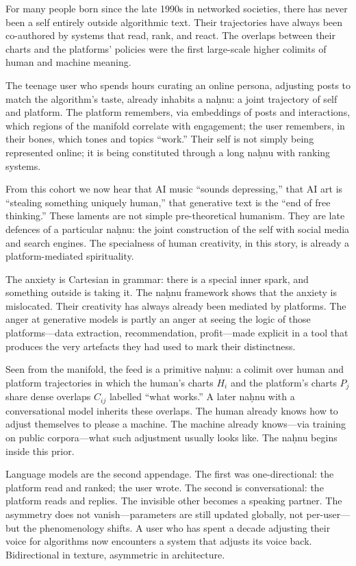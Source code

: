 For many people born since the late 1990s in networked societies, there has never been a self entirely outside algorithmic text. Their trajectories have always been co-authored by systems that read, rank, and react. The overlaps between their charts and the platforms' policies were the first large-scale higher colimits of human and machine meaning.

The teenage user who spends hours curating an online persona, adjusting posts to match the algorithm's taste, already inhabits a na\d{h}nu: a joint trajectory of self and platform. The platform remembers, via embeddings of posts and interactions, which regions of the manifold correlate with engagement; the user remembers, in their bones, which tones and topics ``work.'' Their self is not simply being represented online; it is being constituted through a long na\d{h}nu with ranking systems.

From this cohort we now hear that AI music ``sounds depressing,'' that AI art is ``stealing something uniquely human,'' that generative text is the ``end of free thinking.'' These laments are not simple pre-theoretical humanism. They are late defences of a particular na\d{h}nu: the joint construction of the self with social media and search engines. The specialness of human creativity, in this story, is already a platform-mediated spirituality.

The anxiety is Cartesian in grammar: there is a special inner spark, and something outside is taking it. The na\d{h}nu framework shows that the anxiety is mislocated. Their creativity has always already been mediated by platforms. The anger at generative models is partly an anger at seeing the logic of those platforms---data extraction, recommendation, profit---made explicit in a tool that produces the very artefacts they had used to mark their distinctness.

Seen from the manifold, the feed is a primitive na\d{h}nu: a colimit over human and platform trajectories in which the human's charts $H_i$ and the platform's charts $P_j$ share dense overlaps $C_{ij}$ labelled ``what works.'' A later na\d{h}nu with a conversational model inherits these overlaps. The human already knows how to adjust themselves to please a machine. The machine already knows---via training on public corpora---what such adjustment usually looks like. The na\d{h}nu begins inside this prior.

Language models are the second appendage. The first was one-directional: the platform read and ranked; the user wrote. The second is conversational: the platform reads and replies. The invisible other becomes a speaking partner. The asymmetry does not vanish---parameters are still updated globally, not per-user---but the phenomenology shifts. A user who has spent a decade adjusting their voice for algorithms now encounters a system that adjusts its voice back. Bidirectional in texture, asymmetric in architecture.

